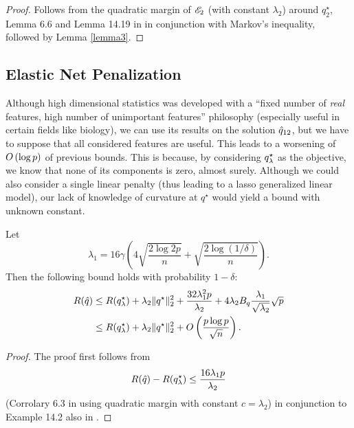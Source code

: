 \documentclass{article}
\begin{document}
\begin{proof}
  Follows from the quadratic margin of $\mathscr{E}_2$ (with constant $\lambda_2$) around
  $q^\star_2$, Lemma 6.6 and Lemma 14.19 in \cite{buhlmann2011statistics} in conjunction
  with Markov's inequality, followed by Lemma \ref{lemma3}. 
\end{proof}


\subsection{Elastic Net Penalization}

Although high dimensional statistics was developed with a ``fixed number of \textit{real}
features, high number of unimportant features'' philosophy (especially useful in certain
fields like biology), we can use its results on the solution $\hat q_{12}$, but we have to
suppose that all considered features are useful. This leads to a worsening of $O\left(\log p\right)$
of previous bounds. This is because, by considering $q^\star_\lambda$ as the objective, we know that
none of its components is zero, almost surely. Although we could also consider a single
linear penalty (thus leading to a lasso generalized linear model), our lack of knowledge
of curvature at $q^\star$ would yield a bound with unknown constant. 

\begin{thm}
  Let
  \[
    \lambda_1 = 16\gamma\left(4\sqrt{\frac{2\log2p}{n}} +
      \sqrt{\frac{2\log(1/\delta)}{n}}\right).
  \]
  Then the following bound holds with probability $1-\delta$:
  \begin{align*}
    R(\hat q) &\leq R(q^\star_\lambda) + \lambda_2\|q^\star\|_2^2 + \frac{32\lambda_1^2p}{\lambda_2} +
             4\lambda_2 B_q\frac{\lambda_1}{\sqrt{\lambda_2}}\sqrt{p}\\
   &\leq R(q^\star_\lambda) + \lambda_2\|q^\star\|^2_2 + O\left(\frac{p\log p}{\sqrt{n}}\right).
  \end{align*}
\end{thm}
\begin{proof}
  The proof first follows from
  \[
    R(\hat q) - R(q^\star_\lambda) \leq \frac{16\lambda_1 p}{\lambda_2}
  \]
  (Corrolary 6.3 in \cite{buhlmann2011statistics} using quadratic margin with constant
  $c=\lambda_2$) in conjunction to Example 14.2 also in \cite{buhlmann2011statistics}.
\end{proof}



\end{document}
